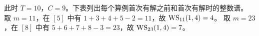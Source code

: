 \documentclass[11pt,a4paper]{article}
\begin{document}
此时 \(T=10\)，\(C=9\)。下表列出每个算例首次有解之前和首次有解时的整数谱。
取 \(m=11\)，在 \([5]\) 中有 \(1+3+4+5-2=11\)，故 \(\operatorname{WS}_{11}(1,4)=4\)。
取 \(m=23\)，在 \([8]\) 中有 \(5+6+7+8-3=23\)，故 \(\operatorname{WS}_{23}(1,4)=7\)。


\smallskip
{}

{\small}
\end{document}
